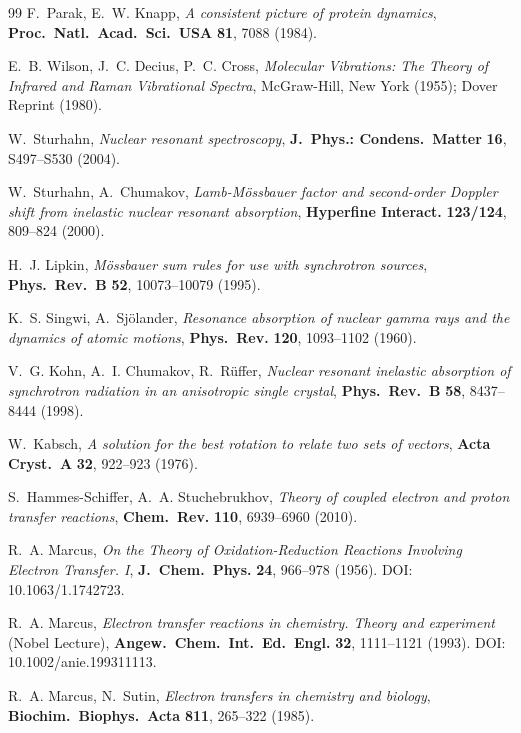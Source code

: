 \documentclass[11pt,a4paper,twoside]{article}
\theoremstyle{remark}
\begin{document}
\begin{thebibliography}{99}
F.~Parak, E.~W. Knapp,
\emph{A consistent picture of protein dynamics},
\textbf{Proc.\ Natl.\ Acad.\ Sci.\ USA} \textbf{81}, 7088 (1984).

E.~B. Wilson, J.~C. Decius, P.~C. Cross,
\emph{Molecular Vibrations: The Theory of Infrared and Raman
Vibrational Spectra},
McGraw-Hill, New York (1955); Dover Reprint (1980).

W.~Sturhahn,
\emph{Nuclear resonant spectroscopy},
\textbf{J.\ Phys.: Condens.\ Matter} \textbf{16}, S497--S530 (2004).

W.~Sturhahn, A.~Chumakov,
\emph{Lamb-M\"ossbauer factor and second-order Doppler shift from
inelastic nuclear resonant absorption},
\textbf{Hyperfine Interact.} \textbf{123/124}, 809--824 (2000).

H.~J. Lipkin,
\emph{M\"ossbauer sum rules for use with synchrotron sources},
\textbf{Phys.\ Rev.\ B} \textbf{52}, 10073--10079 (1995).

K.~S. Singwi, A.~Sj\"olander,
\emph{Resonance absorption of nuclear gamma rays and the dynamics of
atomic motions},
\textbf{Phys.\ Rev.} \textbf{120}, 1093--1102 (1960).

V.~G. Kohn, A.~I. Chumakov, R.~R\"uffer,
\emph{Nuclear resonant inelastic absorption of synchrotron radiation
in an anisotropic single crystal},
\textbf{Phys.\ Rev.\ B} \textbf{58}, 8437--8444 (1998).

W.~Kabsch,
\emph{A solution for the best rotation to relate two sets of vectors},
\textbf{Acta Cryst.\ A} \textbf{32}, 922--923 (1976).

S.~Hammes-Schiffer, A.~A. Stuchebrukhov,
\emph{Theory of coupled electron and proton transfer reactions},
\textbf{Chem.\ Rev.} \textbf{110}, 6939--6960 (2010).

R.~A. Marcus,
\emph{On the Theory of Oxidation-Reduction Reactions Involving
Electron Transfer. I},
\textbf{J.\ Chem.\ Phys.} \textbf{24}, 966--978 (1956).
DOI: 10.1063/1.1742723.

R.~A. Marcus,
\emph{Electron transfer reactions in chemistry. Theory and experiment}
(Nobel Lecture),
\textbf{Angew.\ Chem.\ Int.\ Ed.\ Engl.} \textbf{32}, 1111--1121 (1993).
DOI: 10.1002/anie.199311113.

R.~A. Marcus, N.~Sutin,
\emph{Electron transfers in chemistry and biology},
\textbf{Biochim.\ Biophys.\ Acta} \textbf{811}, 265--322 (1985).


\end{thebibliography}
\end{document}
